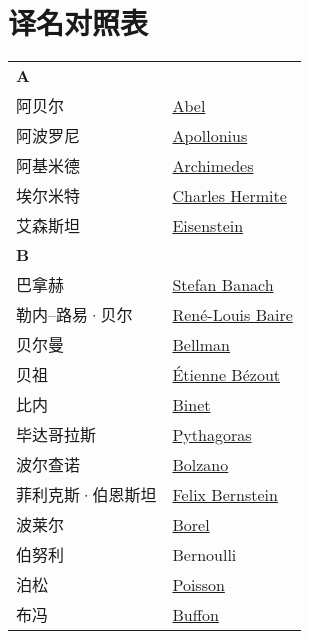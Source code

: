 \chapter{译名对照表}
\def\InsertTable#1{\begin{longtable}{ll} #1 \end{longtable}}%
\InsertTable{
	\textbf{A} \\
	阿贝尔 & \href{https://mathshistory.st-andrews.ac.uk/Biographies/Abel/}{Abel} \\
	阿波罗尼 & \href{https://mathshistory.st-andrews.ac.uk/Biographies/Apollonius/}{Apollonius} \\
	阿基米德 & \href{https://mathshistory.st-andrews.ac.uk/Biographies/Archimedes/}{Archimedes} \\
	埃尔米特 & \href{https://mathshistory.st-andrews.ac.uk/Biographies/Hermite/}{Charles Hermite} \\
	艾森斯坦 & \href{https://mathshistory.st-andrews.ac.uk/Biographies/Eisenstein/}{Eisenstein} \\
	\textbf{B} \\
	巴拿赫 & \href{https://mathshistory.st-andrews.ac.uk/Biographies/Banach/}{Stefan Banach} \\
	勒内--路易·贝尔 & \href{https://mathshistory.st-andrews.ac.uk/Biographies/Baire/}{Ren\'e-Louis Baire} \\
	贝尔曼 & \href{https://mathshistory.st-andrews.ac.uk/Biographies/Bellman/}{Bellman} \\
	贝祖 & \href{https://mathshistory.st-andrews.ac.uk/Biographies/Bezout/}{\'Etienne B\'ezout} \\
	比内 & \href{https://mathshistory.st-andrews.ac.uk/Biographies/Binet/}{Binet} \\
	毕达哥拉斯 & \href{https://mathshistory.st-andrews.ac.uk/Biographies/Pythagoras/}{Pythagoras} \\
	波尔查诺 & \href{https://mathshistory.st-andrews.ac.uk/Biographies/Bolzano/}{Bolzano} \\
	菲利克斯·伯恩斯坦 & \href{https://mathshistory.st-andrews.ac.uk/Biographies/Bernstein_Felix/}{Felix Bernstein} \\
	波莱尔 & \href{https://mathshistory.st-andrews.ac.uk/Biographies/Borel/}{Borel} \\
	伯努利 & Bernoulli \\
	泊松 & \href{https://mathshistory.st-andrews.ac.uk/Biographies/Poisson/}{Poisson} \\
	布冯 & \href{https://mathshistory.st-andrews.ac.uk/Biographies/Buffon/}{Buffon} \\
}
